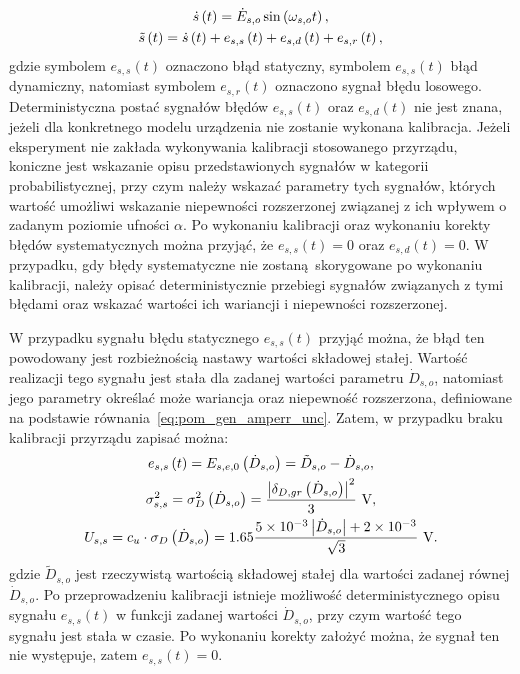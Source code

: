 \begin{gather}
\dot{s} \left(t\right) = \dot{E}_{s,o} \sin \left(\omega_{s,o} t\right) \label{eq:pom_gen_out_ideal}, \\
\tilde{s} \left(t\right) = \dot{s} \left(t\right) + e_{s,s} \left(t\right) + e_{s,d} \left(t\right) + e_{s,r} \left(t\right)\label{eq:pom_gen_out_real},
\end{gather}
gdzie symbolem $e_{s,s}(t)$ oznaczono błąd statyczny, symbolem $e_{s,s}(t)$ błąd dynamiczny, natomiast symbolem $e_{s,r}(t)$ oznaczono sygnał błędu losowego. Deterministyczna postać sygnałów błędów $e_{s,s}(t)$ oraz $e_{s,d}(t)$ nie jest znana, jeżeli dla konkretnego modelu urządzenia nie zostanie wykonana kalibracja. Jeżeli eksperyment nie zakłada wykonywania kalibracji stosowanego przyrządu, koniczne jest wskazanie opisu przedstawionych sygnałów w kategorii probabilistycznej, przy czym należy wskazać parametry tych sygnałów, których wartość umożliwi wskazanie niepewności rozszerzonej związanej z ich wpływem o zadanym poziomie ufności $\alpha$. Po wykonaniu kalibracji oraz wykonaniu korekty błędów systematycznych można przyjąć, że $e_{s,s}(t) = 0$ oraz $e_{s,d}(t) = 0$. W przypadku, gdy błędy systematyczne nie zostaną skorygowane po wykonaniu kalibracji, należy opisać deterministycznie przebiegi sygnałów związanych z tymi błędami oraz wskazać wartości ich wariancji i niepewności rozszerzonej.

W przypadku sygnału błędu statycznego $e_{s,s}(t)$ przyjąć można, że błąd ten powodowany jest rozbieżnością nastawy wartości składowej stałej. Wartość realizacji tego sygnału jest stała dla zadanej wartości parametru $\dot{D}_{s,o}$, natomiast jego parametry określać może wariancja oraz niepewność rozszerzona, definiowane na podstawie równania~\eqref{eq:pom_gen_amperr_unc}. Zatem, w przypadku braku kalibracji przyrządu zapisać można:
\begin{gather}
e_{s,s} \emb{t} = E_{s,e,0} \emb{\dot{D}_{s,o}} = \tilde{D}_{s,o} - \dot{D}_{s,o} \label{eq:pom_gen_err_stat}, \\
\sigma_{s,s}^{2} = \sigma_{D}^{2} \emb{\dot{D}_{s,o}} = \frac{\left| \delta_{D,gr} \emb{\dot{D}_{s,o}} \right|^{2}}{3} ~\unit{V} \label{eq:pom_gen_var_stat}, \\
U_{s,s} = c_{u} \cdot \sigma_{D} \emb{\dot{D}_{s,o}} = 1.65 \frac{\num{5e-3} \left| \dot{D}_{s,o} \right| + \num{2e-3}}{\sqrt{3}} ~\unit{V} \label{eq:pom_gen_unc_stat}.
\end{gather}
gdzie $\tilde{D}_{s,o}$ jest rzeczywistą wartością składowej stałej dla wartości zadanej równej $\dot{D}_{s,o}$. Po przeprowadzeniu kalibracji istnieje możliwość deterministycznego opisu sygnału $e_{s,s}(t)$ w funkcji zadanej wartości $\dot{D}_{s,o}$, przy czym wartość tego sygnału jest stała w czasie. Po wykonaniu korekty założyć można, że sygnał ten nie występuje, zatem $e_{s,s}(t) = 0$.

